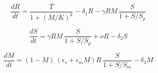 
\begin{equation}
\frac{dR}{dt}= \frac{T}{1 + (M/K)^k} - \delta_1 R - \gamma R M \,\frac{S}{1 + S/S_p}
\label{R}
\end{equation}

\begin{equation}
\frac{dS}{dt}= \gamma R M \,\frac{S}{1 + S/S_p} + \nu R - \delta_2 S
\label{S}
\end{equation}

\begin{equation}
\frac{dM}{dt}= (1-M)\,\left(\epsilon_s + \epsilon_m M\right) R \,\frac{S}{1 + S/S_m} - \delta_3 M
\label{M}
\end{equation}


